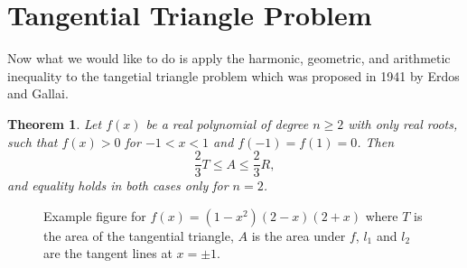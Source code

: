 \documentclass[12pt]{extreport}
\newtheorem*{thm}{Theorem}
\begin{document}
\section*{Tangential Triangle Problem}
Now what we would like to do is apply the harmonic, geometric, and arithmetic inequality to the tangetial triangle problem which was proposed in 1941 by Erdos and Gallai.
\begin{thm}
Let $f(x)$ be a real polynomial of degree $n\geq 2$ with only real roots, such that $f(x)>0$ for $-1<x<1$ and $f(-1) = f(1) = 0$. Then $$\frac{2}{3}T \leq A \leq \frac{2}{3}R,$$ and equality holds in both cases only for $n = 2$.
\end{thm}
\begin{figure}[H]
\centering
{}
\caption{Example figure for $f(x) = (1 - x^2) (2 - x) (2 + x)$ where $T$ is the area of the tangential triangle, $A$ is the area under $f$, $l_1$ and $l_2$ are the tangent lines at $x = \pm 1$.}
\end{figure}
\end{document}

